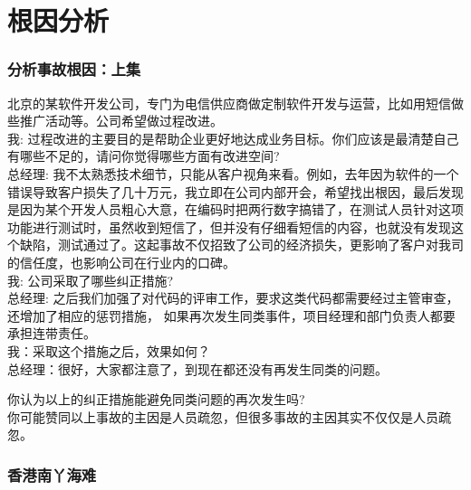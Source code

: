 
\chapter{根因分析} %

\hypertarget{ux5206ux6790ux4e8bux6545ux6839ux56e0ux4e0aux96c6}{%
\subsection{分析事故根因：上集}\label{ux5206ux6790ux4e8bux6545ux6839ux56e0ux4e0aux96c6}}

北京的某软件开发公司，专门为电信供应商做定制软件开发与运营，比如用短信做些推广活动等。公司希望做过程改进。\\
我:
过程改进的主要目的是帮助企业更好地达成业务目标。你们应该是最清楚自己有哪些不足的，请问你觉得哪些方面有改进空间?\\
总经理:
我不太熟悉技术细节，只能从客户视角来看。例如，去年因为软件的一个错误导致客户损失了几十万元，我立即在公司内部开会，希望找出根因，最后发现是因为某个开发人员粗心大意，在编码时把两行数字搞错了，在测试人员针对这项功能进行测试时，虽然收到短信了，但并没有仔细看短信的内容，也就没有发现这个缺陷，测试通过了。这起事故不仅招致了公司的经济损失，更影响了客户对我司的信任度，也影响公司在行业内的口碑。\\
我: 公司采取了哪些纠正措施?\\
总经理:
之后我们加强了对代码的评审工作，要求这类代码都需要经过主管审查，还增加了相应的惩罚措施，
如果再次发生同类事件，项目经理和部门负责人都要承担连带责任。\\
我：采取这个措施之后，效果如何？\\
总经理：很好，大家都注意了，到现在都还没有再发生同类的问题。

\begin{description}
\item[]
\begin{description}
\tightlist
\item[]
= = =
\end{description}
\end{description}

你认为以上的纠正措施能避免同类问题的再次发生吗?\\
你可能赞同以上事故的主因是人员疏忽，但很多事故的主因其实不仅仅是人员疏忽。

\hypertarget{ux9999ux6e2fux5357ux4e2bux6d77ux96be}{%
\subsection{香港南丫海难}\label{ux9999ux6e2fux5357ux4e2bux6d77ux96be}}

